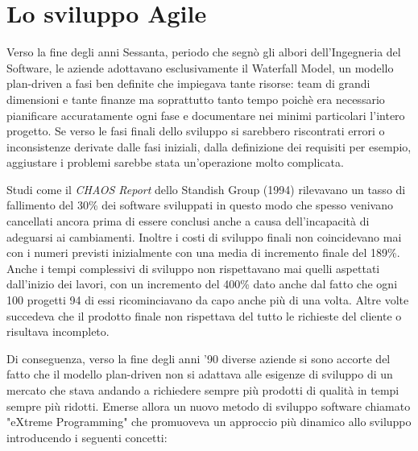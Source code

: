 \documentclass[target=bach,aauheader=,style=]{thud}
\begin{document}
\section{Lo sviluppo Agile}
Verso la fine degli anni Sessanta, periodo che segnò gli albori dell'Ingegneria del Software, le aziende adottavano esclusivamente il Waterfall Model,
un modello plan-driven a fasi ben definite che impiegava tante risorse: team di grandi dimensioni e tante finanze ma soprattutto tanto tempo
poichè era necessario pianificare accuratamente ogni fase e documentare nei minimi particolari l'intero progetto. Se verso le fasi finali dello
sviluppo si sarebbero riscontrati errori o inconsistenze derivate dalle fasi iniziali, dalla definizione dei requisiti per esempio, aggiustare i
problemi sarebbe stata un'operazione molto complicata.
\par Studi come il \textit{CHAOS Report}\cite{standish1994chaos} dello Standish Group (1994) rilevavano un tasso di fallimento del 30\% dei software
sviluppati in questo modo che spesso venivano cancellati ancora prima di essere conclusi anche a causa dell'incapacità di adeguarsi ai cambiamenti.
Inoltre i costi di sviluppo finali non coincidevano mai con i numeri previsti inizialmente con una media di incremento finale del 189\%.
Anche i tempi complessivi di sviluppo non rispettavano mai quelli aspettati dall'inizio dei lavori, con un incremento del 400\% dato anche dal
fatto che ogni 100 progetti 94 di essi ricominciavano da capo anche più di una volta.
Altre volte succedeva che il prodotto finale non rispettava del tutto le richieste del cliente o risultava incompleto.
\par Di conseguenza, verso la fine degli anni '90 diverse aziende si sono accorte del fatto che il modello plan-driven non si adattava alle esigenze di sviluppo di un
mercato che stava andando a richiedere sempre più prodotti di qualità in tempi sempre più ridotti.
Emerse allora un nuovo metodo di sviluppo software chiamato "eXtreme Programming" che promuoveva un approccio più dinamico allo sviluppo introducendo i seguenti concetti:
\end{document}
